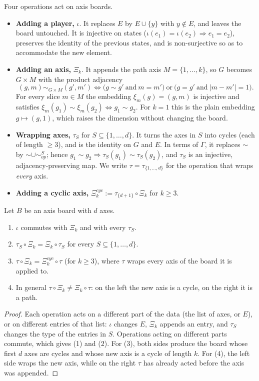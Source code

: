 Four operations act on axis boards.
\begin{itemize}
	\item \textbf{Adding a player,} $\iota$. It replaces $E$ by $E\cup\{y\}$ with $y\notin E$, and leaves the board untouched. It is injective on states ($\iota(e_1)=\iota(e_2)\Rightarrow e_1=e_2$), preserves the identity of the previous states, and is non-surjective so as to accommodate the new element.
	\item \textbf{Adding an axis,} $\Xi_k$. It appends the path axis $M=\{1,\dots,k\}$, so $G$ becomes $G\times M$ with the product adjacency
	$$(g,m)\sim_{G\times M}(g',m')\iff\bigl(g\sim g'\ \text{and}\ m=m'\bigr)\ \text{or}\ \bigl(g=g'\ \text{and}\ |m-m'|=1\bigr).$$
	For every slice $m\in M$ the embedding $\xi_m(g)=(g,m)$ is injective and satisfies $\xi_m(g_1)\sim\xi_m(g_2)\iff g_1\sim g_2$. For $k=1$ this is the plain embedding $g\mapsto(g,1)$, which raises the dimension without changing the board.
	\item \textbf{Wrapping axes,} $\tau_S$ for $S\subseteq\{1,\dots,d\}$. It turns the axes in $S$ into cycles (each of length $\ge3$), and is the identity on $G$ and $E$. In terms of $\Gamma$, it replaces $\sim$ by $\sim\cup\sim^{S}_{op}$; hence $g_1\sim g_2\Rightarrow\tau_S(g_1)\sim\tau_S(g_2)$, and $\tau_S$ is an injective, adjacency-preserving map. We write $\tau=\tau_{\{1,\dots,d\}}$ for the operation that wraps \emph{every} axis.
	\item \textbf{Adding a cyclic axis,} $\Xi^{cyc}_k:=\tau_{\{d+1\}}\circ\Xi_k$ for $k\ge3$.
\end{itemize}

\begin{lemma}[Commutation]\label{lem:conmutacion}
	Let $B$ be an axis board with $d$ axes.
	\begin{enumerate}
		\item $\iota$ commutes with $\Xi_k$ and with every $\tau_S$.
		\item $\tau_S\circ\Xi_k=\Xi_k\circ\tau_S$ for every $S\subseteq\{1,\dots,d\}$.
		\item $\tau\circ\Xi_k=\Xi^{cyc}_k\circ\tau$ (for $k\ge3$), where $\tau$ wraps every axis of the board it is applied to.
		\item In general $\tau\circ\Xi_k\neq\Xi_k\circ\tau$: on the left the new axis is a cycle, on the right it is a path.
	\end{enumerate}
\end{lemma}
\begin{proof}
	Each operation acts on a different part of the data (the list of axes, or $E$), or on different entries of that list: $\iota$ changes $E$, $\Xi_k$ appends an entry, and $\tau_S$ changes the type of the entries in $S$. Operations acting on different parts commute, which gives (1) and (2). For (3), both sides produce the board whose first $d$ axes are cycles and whose new axis is a cycle of length $k$. For (4), the left side wraps the new axis, while on the right $\tau$ has already acted before the axis was appended. \end{proof}

